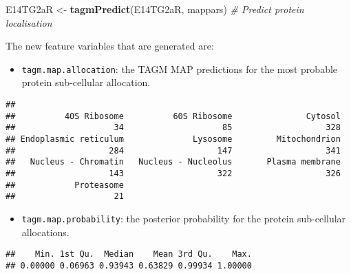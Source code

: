 \documentclass[]{article}
\newenvironment{Shaded}{\begin{snugshade}}{\end{snugshade}}
\newcommand{\KeywordTok}[1]{\textcolor[rgb]{0.13,0.29,0.53}{\textbf{{#1}}}}
\newcommand{\StringTok}[1]{\textcolor[rgb]{0.31,0.60,0.02}{{#1}}}
\newcommand{\CommentTok}[1]{\textcolor[rgb]{0.56,0.35,0.01}{\textit{{#1}}}}
\newcommand{\NormalTok}[1]{{#1}}
\providecommand{\tightlist}{%
  \setlength{\itemsep}{0pt}\setlength{\parskip}{0pt}}
\begin{document}
\begin{Shaded}
\begin{Highlighting}[]
\NormalTok{E14TG2aR <-}\StringTok{ }\KeywordTok{tagmPredict}\NormalTok{(E14TG2aR, mappars) }\CommentTok{# Predict protein localisation}
\end{Highlighting}
\end{Shaded}

The new feature variables that are generated are:

\begin{itemize}
\tightlist
\item
  \texttt{tagm.map.allocation}: the TAGM MAP predictions for the most
  probable protein sub-cellular allocation.
\end{itemize}

\begin{Shaded}
\end{Shaded}

\begin{verbatim}
## 
##          40S Ribosome          60S Ribosome               Cytosol 
##                    34                    85                   328 
## Endoplasmic reticulum              Lysosome         Mitochondrion 
##                   284                   147                   341 
##   Nucleus - Chromatin   Nucleus - Nucleolus       Plasma membrane 
##                   143                   322                   326 
##            Proteasome 
##                    21
\end{verbatim}

\begin{itemize}
\tightlist
\item
  \texttt{tagm.map.probability}: the posterior probability for the
  protein sub-cellular allocations.
\end{itemize}

\begin{Shaded}
\end{Shaded}

\begin{verbatim}
##    Min. 1st Qu.  Median    Mean 3rd Qu.    Max. 
## 0.00000 0.06963 0.93943 0.63829 0.99934 1.00000
\end{verbatim}
\end{document}
